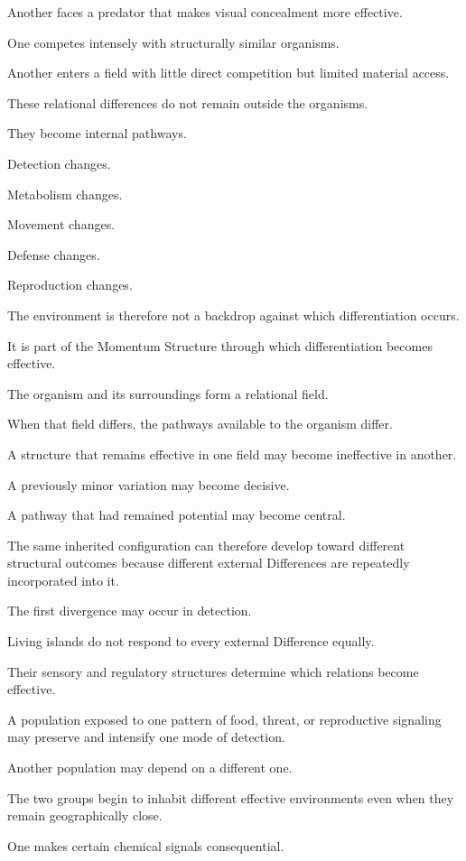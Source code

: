 Another faces a predator that makes visual concealment more effective.

One competes intensely with structurally similar organisms.

Another enters a field with little direct competition but limited material access.

These relational differences do not remain outside the organisms.

They become internal pathways.

Detection changes.

Metabolism changes.

Movement changes.

Defense changes.

Reproduction changes.

The environment is therefore not a backdrop against which differentiation occurs.

It is part of the Momentum Structure through which differentiation becomes effective.

The organism and its surroundings form a relational field.

When that field differs, the pathways available to the organism differ.

A structure that remains effective in one field may become ineffective in another.

A previously minor variation may become decisive.

A pathway that had remained potential may become central.

The same inherited configuration can therefore develop toward different structural outcomes because different external Differences are repeatedly incorporated into it.

The first divergence may occur in detection.

Living islands do not respond to every external Difference equally.

Their sensory and regulatory structures determine which relations become effective.

A population exposed to one pattern of food, threat, or reproductive signaling may preserve and intensify one mode of detection.

Another population may depend on a different one.

The two groups begin to inhabit different effective environments even when they remain geographically close.

One makes certain chemical signals consequential.

